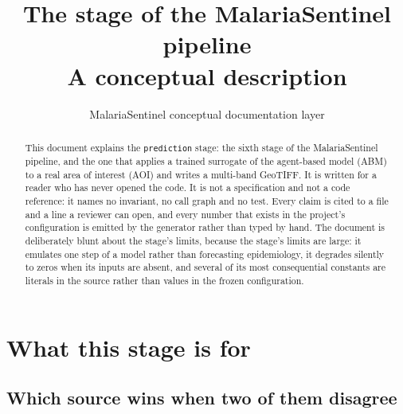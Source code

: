\documentclass[11pt,a4paper]{article}
\title{The \code{prediction} stage of the MalariaSentinel pipeline\\
\large A conceptual description}
\author{MalariaSentinel conceptual documentation layer}
\date{}
\newcommand{\code}[1]{\texttt{#1}}
\begin{document}
\maketitle

\begin{abstract}
\noindent
This document explains the \code{prediction} stage: the sixth stage of the
MalariaSentinel pipeline, and the one that applies a trained surrogate of the
agent-based model (ABM) to a real area of interest (AOI) and writes a
multi-band GeoTIFF. It is written for a reader who has never opened the
code. It is not a specification and not a code reference: it names no
invariant, no call graph and no test. Every claim is cited to a file and a
line a reviewer can open, and every number that exists in the project's
configuration is emitted by the generator rather than typed by hand. The
document is deliberately blunt about the stage's limits, because the stage's
limits are large: it emulates one step of a model rather than forecasting
epidemiology, it degrades silently to zeros when its inputs are absent, and
several of its most consequential constants are literals in the source rather
than values in the frozen configuration.
\end{abstract}

\tableofcontents

\section{What this stage is for}

\subsection{Which source wins when two of them disagree}
\end{document}
